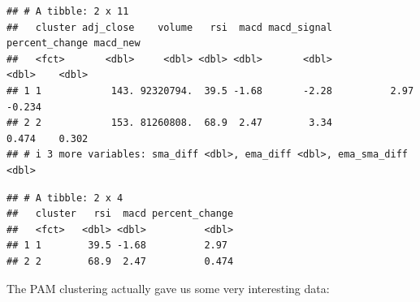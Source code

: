 \documentclass[
]{article}
\newenvironment{Shaded}{\begin{snugshade}}{\end{snugshade}}
\newcommand{\AttributeTok}[1]{\textcolor[rgb]{0.77,0.63,0.00}{#1}}
\newcommand{\FunctionTok}[1]{\textcolor[rgb]{0.00,0.00,0.00}{#1}}
\newcommand{\NormalTok}[1]{#1}
\newcommand{\SpecialCharTok}[1]{\textcolor[rgb]{0.00,0.00,0.00}{#1}}
\begin{document}
\begin{verbatim}
## # A tibble: 2 x 11
##   cluster adj_close    volume   rsi  macd macd_signal percent_change macd_new
##   <fct>       <dbl>     <dbl> <dbl> <dbl>       <dbl>          <dbl>    <dbl>
## 1 1            143. 92320794.  39.5 -1.68       -2.28          2.97    -0.234
## 2 2            153. 81260808.  68.9  2.47        3.34          0.474    0.302
## # i 3 more variables: sma_diff <dbl>, ema_diff <dbl>, ema_sma_diff <dbl>
\end{verbatim}

\begin{Shaded}
\end{Shaded}

\begin{verbatim}
## # A tibble: 2 x 4
##   cluster   rsi  macd percent_change
##   <fct>   <dbl> <dbl>          <dbl>
## 1 1        39.5 -1.68          2.97 
## 2 2        68.9  2.47          0.474
\end{verbatim}

The PAM clustering actually gave us some very interesting data:
\end{document}
